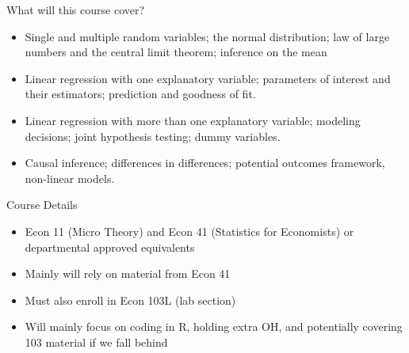\documentclass[notheorems,9pt]{beamer}
\begin{document}
\begin{frame}{What will this course cover?} 
	\begin{itemize}
		\item<1->  Single and multiple random variables; the normal distribution; law of large numbers and the central limit theorem; inference on the mean
		\item<2->  Linear regression with one explanatory variable; parameters of interest and their estimators; prediction and goodness of fit.
		\item<3->  Linear regression with more than one explanatory variable; modeling decisions; joint hypothesis testing; dummy variables.
		\item<4->  Causal inference; differences in differences; potential outcomes framework, non-linear models.
	\end{itemize}	
\end{frame}

\begin{frame}{Course Details} 
	\begin{itemize}
		\item Econ 11 (Micro Theory) and Econ 41 (Statistics for Economists) or departmental approved equivalents
		\item Mainly will rely on material from Econ 41
	\end{itemize}
	\begin{itemize}
		\item Must also enroll in Econ 103L (lab section)
		\item Will mainly focus on coding in R, holding extra OH, and potentially covering 103 material if we fall behind
	\end{itemize}
\end{frame}
\end{document}
